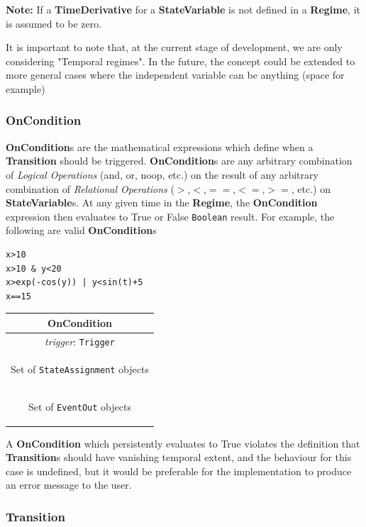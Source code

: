 \documentclass{article}
\newcommand{\note}[1]{%
\begin{center}
\colorbox{issuecolor}{\parbox{0.8\linewidth}{\textbf{Note:} #1}}
\end{center}%
}
\newcommand{\nmlClass}[1]{{\bf #1}}
\newcommand{\StateVariable}{{\bf{StateVariable}}\xspace}
\newcommand{\Regime}{{\bf{Regime}}\xspace}
\begin{document}
\note{If a \nmlClass{TimeDerivative} for a \StateVariable is not defined
in a \Regime, it is assumed to be zero.}

It is important to note that, at the current stage of development, we are only
considering "Temporal regimes". In the future, the concept could be extended
to more general cases where the independent variable can be anything (space
for example)

\subsubsection{OnCondition}

\nmlClass{OnCondition}s are the mathematical expressions which define
when a \nmlClass{Transition} should be triggered.
\nmlClass{OnCondition}s are any arbitrary combination of \emph{Logical
Operations} (and, or, noop, etc.) on the
result of any arbitrary combination of \emph{Relational Operations}
($>$,$<$,$==$,$<=$,$>=$, etc.) on
\nmlClass{StateVariable}s. At any given time in the \nmlClass{Regime},
the \nmlClass{OnCondition} expression then evaluates to True or False
{\tt Boolean} result. For example, the following are valid
\nmlClass{OnCondition}s

\begin{verbatim}
x>10
x>10 & y<20
x>exp(-cos(y)) | y<sin(t)+5
x==15
\end{verbatim}

\begin{table}[htb]
\center
\begin{tabular}{|c|}
\hline
\hline
OnCondition \\
\hline
\hline
{\em trigger}: {\tt Trigger} \\
\hline
\colorbox{issuecolor}{\parbox{0.4\linewidth}
{\center Set of {\tt StateAssignment} objects}} \\
\hline
\colorbox{issuecolor}{\parbox{0.4\linewidth}
{\center Set of {\tt EventOut} objects}} \\
\hline
\end{tabular}
\end{table}

A \nmlClass{OnCondition} which persistently evaluates to True violates
the definition that \nmlClass{Transition}s should have vanishing
temporal extent, and the behaviour for this case is undefined, but it
would be preferable for the implementation to produce an error message
to the user.

\subsubsection{Transition}
\label{transition}
\end{document}
